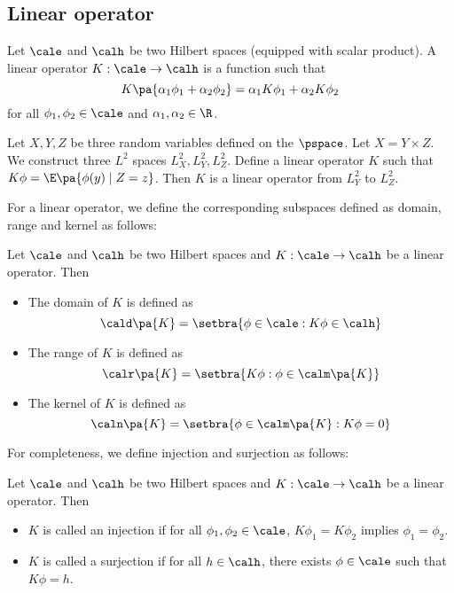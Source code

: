 \subsection{Linear operator}
\begin{definition}
    Let $\cale$ and $\calh$ be two Hilbert spaces (equipped with scalar product). A linear operator $K:\cale\rightarrow\calh$ is a function such that
    \begin{equation*}
        K\pa{\alpha_1\phi_1+\alpha_2\phi_2}=\alpha_1K\phi_1+\alpha_2K\phi_2
    \end{equation*}
    for all $\phi_1,\phi_2\in\cale$ and $\alpha_1,\alpha_2\in\R$.
\end{definition}
\begin{example}
    Let $X,Y,Z$ be three random variables defined on the $\pspace$. Let $X=Y\times Z$. We construct three $L^2$ spaces $L_X^2,L_Y^2,L_Z^2$. Define a linear operator $K$ such that $K\phi= \E\pa{\phi(y)\mid Z=z}$. Then $K$ is a linear operator from $L_Y^2$ to $L_Z^2$.
\end{example}
For a linear operator, we define the corresponding subspaces defined as domain, range and kernel as follows:
\begin{definition}
    Let $\cale$ and $\calh$ be two Hilbert spaces and $K:\cale\rightarrow\calh$ be a linear operator. Then
    \begin{itemize}
        \item The domain of $K$ is defined as
              \begin{equation*}
                  \cald\pa{K}=\setbra{\phi\in\cale:K\phi\in\calh}
              \end{equation*}
        \item The range of $K$ is defined as
              \begin{equation*}
                  \calr\pa{K}=\setbra{K\phi:\phi\in\calm\pa{K}}
              \end{equation*}
        \item The kernel of $K$ is defined as
              \begin{equation*}
                  \caln\pa{K}=\setbra{\phi\in\calm\pa{K}:K\phi=0}
              \end{equation*}
    \end{itemize}
\end{definition}

For completeness, we define injection and surjection as follows:
\begin{definition}
    Let $\cale$ and $\calh$ be two Hilbert spaces and $K:\cale\rightarrow\calh$ be a linear operator. Then
    \begin{itemize}
        \item $K$ is called an injection if for all $\phi_1,\phi_2\in\cale$, $K\phi_1=K\phi_2$ implies $\phi_1=\phi_2$.
        \item $K$ is called a surjection if for all $h\in\calh$, there exists $\phi\in\cale$ such that $K\phi=h$.
    \end{itemize}
\end{definition}

